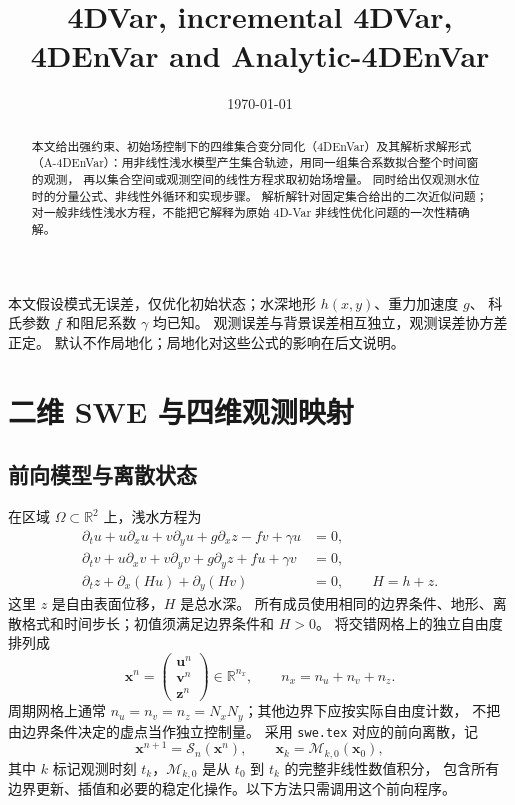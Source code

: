 \documentclass[11pt,a4paper]{article}
\title{4DVar, incremental 4DVar, 4DEnVar and Analytic-4DEnVar}
\author{}
\date{\today}
\newcommand{\R}{\mathbb R}
\newcommand{\xx}{\mathbf x}
\begin{document}
\maketitle

\begin{abstract}
本文给出强约束、初始场控制下的四维集合变分同化（4DEnVar）及其解析求解形式
（A-4DEnVar）：用非线性浅水模型产生集合轨迹，用同一组集合系数拟合整个时间窗的观测，
再以集合空间或观测空间的线性方程求取初始场增量。
同时给出仅观测水位时的分量公式、非线性外循环和实现步骤。
解析解针对固定集合给出的二次近似问题；对一般非线性浅水方程，不能把它解释为原始
4D-Var 非线性优化问题的一次性精确解。
\end{abstract}


本文假设模式无误差，仅优化初始状态；水深地形 $h(x,y)$、重力加速度 $g$、
科氏参数 $f$ 和阻尼系数 $\gamma$ 均已知。
观测误差与背景误差相互独立，观测误差协方差正定。
默认不作局地化；局地化对这些公式的影响在后文说明。

\section{二维 SWE 与四维观测映射}

\subsection{前向模型与离散状态}

在区域 $\Omega\subset\R^2$ 上，浅水方程为
\begin{align}
 \partial_t u+u\partial_xu+v\partial_yu+g\partial_xz-fv+\gamma u&=0,\\
 \partial_t v+u\partial_xv+v\partial_yv+g\partial_yz+fu+\gamma v&=0,\\
 \partial_t z+\partial_x(Hu)+\partial_y(Hv)&=0,
 \qquad H=h+z.
 \label{eq:swe}
\end{align}
这里 $z$ 是自由表面位移，$H$ 是总水深。
所有成员使用相同的边界条件、地形、离散格式和时间步长；初值须满足边界条件和 $H>0$。
将交错网格上的独立自由度排列成
\begin{equation}
 \xx^n=\begin{pmatrix}\mathbf u^n\\\mathbf v^n\\\mathbf z^n\end{pmatrix}
 \in\R^{n_x},\qquad n_x=n_u+n_v+n_z.
\end{equation}
周期网格上通常 $n_u=n_v=n_z=N_xN_y$；其他边界下应按实际自由度计数，
不把由边界条件决定的虚点当作独立控制量。
采用 \texttt{swe.tex} 对应的前向离散，记
\begin{equation}
 \xx^{n+1}=\mathcal S_n(\xx^n),\qquad
 \xx_k=\mathcal M_{k,0}(\xx_0),
 \label{eq:forward}
\end{equation}
其中 $k$ 标记观测时刻 $t_k$，$\mathcal M_{k,0}$ 是从 $t_0$ 到 $t_k$ 的完整非线性数值积分，
包含所有边界更新、插值和必要的稳定化操作。以下方法只需调用这个前向程序。
\end{document}
